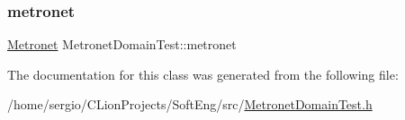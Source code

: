 \subsubsection{\texorpdfstring{metronet}{metronet}}
{\footnotesize\ttfamily \hyperlink{class_metronet}{Metronet} Metronet\+Domain\+Test\+::metronet\hspace{0.3cm}{\ttfamily [protected]}}



The documentation for this class was generated from the following file\+:\begin{DoxyCompactItemize}
\item 
/home/sergio/\+C\+Lion\+Projects/\+Soft\+Eng/src/\hyperlink{_metronet_domain_test_8h}{Metronet\+Domain\+Test.\+h}\end{DoxyCompactItemize}
